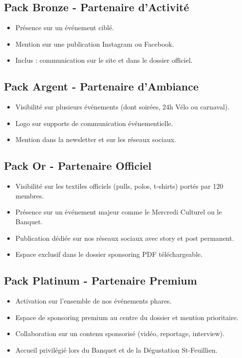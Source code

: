 \documentclass[11pt,a4paper]{scrartcl}
\begin{document}
\subsection{Pack Bronze - Partenaire d'Activité}
\begin{itemize}[leftmargin=*]
    \item Présence sur un événement ciblé.
    \item Mention sur une publication Instagram ou Facebook.
    \item Inclus : communication sur le site et dans le dossier officiel.
\end{itemize}

\subsection{Pack Argent - Partenaire d'Ambiance}
\begin{itemize}[leftmargin=*]
    \item Visibilité sur plusieurs événements (dont soirées, 24h Vélo ou carnaval).
    \item Logo sur supports de communication événementielle.
    \item Mention dans la newsletter et sur les réseaux sociaux.
\end{itemize}

\subsection{Pack Or - Partenaire Officiel}
\begin{itemize}[leftmargin=*]
    \item Visibilité sur les textiles officiels (pulls, polos, t-shirts) portés par 120 membres.
    \item Présence sur un événement majeur comme le Mercredi Culturel ou le Banquet.
    \item Publication dédiée sur nos réseaux sociaux avec story et post permanent.
    \item Espace exclusif dans le dossier sponsoring PDF téléchargeable.
\end{itemize}

\subsection{Pack Platinum - Partenaire Premium}
\begin{itemize}[leftmargin=*]
    \item Activation sur l'ensemble de nos événements phares.
    \item Espace de sponsoring premium au centre du dossier et mention prioritaire.
    \item Collaboration sur un contenu sponsorisé (vidéo, reportage, interview).
    \item Accueil privilégié lors du Banquet et de la Dégustation St-Feuillien.
\end{itemize}
\end{document}
